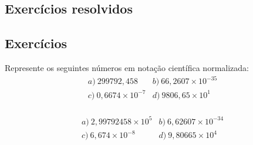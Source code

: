 \subsection*{Exercícios resolvidos}

\construirExeresol

\subsection*{Exercícios}

\construirExer

\begin{exer}\label{exer:notacao_cientifica_normalizada}
  Represente os seguintes números em notação científica normalizada:
  \begin{equation}
    \begin{array}{ll}
      a)~299792,458 & b)~66,2607\times 10^{-35}\\
      c)~0,6674\times 10^{-7} & d)~9806,65\times 10^{1}
    \end{array}
  \end{equation}
  \begin{eqnarray*}
  \end{eqnarray*}
\end{exer}
\begin{resp}
  \begin{equation}
  \begin{array}{ll}
    a)~2,99792458\times 10^5 & b)~6,62607\times 10^{-34}\\
    c)~6,674\times 10^{-8} & d)~9,80665\times 10^4
  \end{array}
  \end{equation}
\end{resp}

